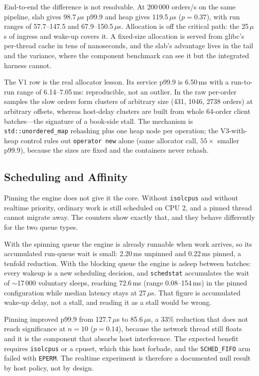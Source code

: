 \documentclass[conference]{IEEEtran}
\newcommand{\us}{\,$\mu$s}
\begin{document}
End-to-end the difference is not resolvable. At 200\,000 orders/s on the same
pipeline, slab gives 98.7\us{} p99.9 and heap gives 119.5\us{} ($p=0.37$), with
run ranges of 57.7--147.5 and 67.9--150.5\us. Allocation is off the critical
path: the 25\us{} of ingress and wake-up covers it. A fixed-size allocation is
served from glibc's per-thread cache in tens of nanoseconds, and the slab's
advantage lives in the tail and the variance, where the component benchmark can
see it but the integrated harness cannot.

The V1 row is the real allocator lesson. Its service p99.9 is 6.50\,ms with a
run-to-run range of 6.14--7.05\,ms: reproducible, not an outlier. In the raw
per-order samples the slow orders form clusters of arbitrary size (431, 1046,
2738 orders) at arbitrary offsets, whereas host-delay clusters are built from
whole 64-order client batches---the signature of a book-side stall. The
mechanism is \texttt{std::unordered\_map} rehashing plus one heap node per
operation; the V3-with-heap control rules out \texttt{operator new} alone (same
allocator call, $55\times$ smaller p99.9), because the sizes are fixed and the
containers never rehash.

\subsection{Scheduling and Affinity}
Pinning the engine does not give it the core. Without \texttt{isolcpus} and
without realtime priority, ordinary work is still scheduled on CPU 2, and a
pinned thread cannot migrate away. The counters show exactly that, and they
behave differently for the two queue types.

With the spinning queue the engine is already runnable when work arrives, so its
accumulated run-queue wait is small: 2.20\,ms unpinned and 0.22\,ms pinned, a
tenfold reduction. With the blocking queue the engine is asleep between batches:
every wakeup is a new scheduling decision, and \texttt{schedstat} accumulates the
wait of $\sim$17\,000 voluntary sleeps, reaching 72.6\,ms (range 0.08--154\,ms)
in the pinned configuration while median latency stays at 27\us. That figure is
accumulated wake-up delay, not a stall, and reading it as a stall would be wrong.

Pinning improved p99.9 from 127.7\us{} to 85.6\us{}, a 33\% reduction that does
not reach significance at $n=10$ ($p=0.14$), because the network thread still
floats and it is the component that absorbs host interference. The expected
benefit requires \texttt{isolcpus} or a cpuset, which this host forbade, and the
\texttt{SCHED\_FIFO} arm failed with \texttt{EPERM}. The realtime experiment is
therefore a documented null result by host policy, not by design.
\end{document}
